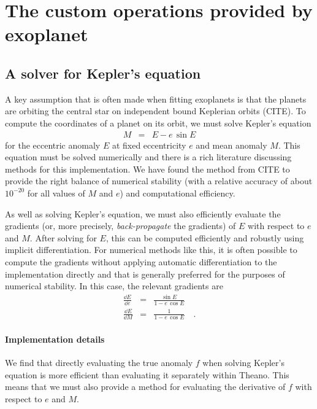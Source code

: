 \documentclass[modern]{aastex62}
\begin{document}
\section{The custom operations provided by exoplanet}

\subsection{A solver for Kepler's equation}

A key assumption that is often made when fitting exoplanets is that the
planets are orbiting the central star on independent bound Keplerian orbits
(CITE).
To compute the coordinates of a planet on its orbit, we must solve Kepler's
equation
\begin{eqnarray}
M &=& E - e\,\sin E
\end{eqnarray}
for the eccentric anomaly $E$ at fixed eccentricity $e$ and mean anomaly $M$.
This equation must be solved numerically and there is a rich literature
discussing methods for this implementation.
We have found the method from CITE to provide the right balance of numerical
stability (with a relative accuracy of about $10^{-20}$ for all values of $M$
and $e$) and computational efficiency.

As well as solving Kepler's equation, we must also efficiently evaluate the
gradients (or, more precisely, \emph{back-propagate} the gradients) of $E$
with respect to $e$ and $M$.
After solving for $E$, this can be computed efficiently and robustly using
implicit differentiation.
For numerical methods like this, it is often possible to compute the gradients
without applying automatic differentiation to the implementation directly and
that is generally preferred for the purposes of numerical stability.
In this case, the relevant gradients are
\begin{eqnarray}
\frac{\dd E}{\dd e} &=& \frac{\sin E}{1 - e\,\cos E} \\
\frac{\dd E}{\dd M} &=& \frac{1}{1 - e\,\cos E} \quad.
\end{eqnarray}

\paragraph{Implementation details}

We find that directly evaluating the true anomaly $f$
when solving Kepler's equation is more efficient than evaluating it separately
within Theano.
This means that we must also provide a method for evaluating the derivative of
$f$ with respect to $e$ and $M$.
\end{document}
